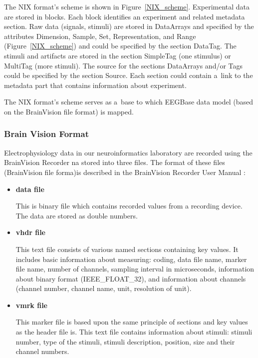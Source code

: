 \documentclass[conference]{IEEEtran}
\begin{document}
The NIX format's scheme is shown in Figure~\ref{NIX_scheme}. Experimental data are stored in blocks. Each block identifies an experiment and related metadata section. Raw data (signals, stimuli) are stored in DataArrays and specified by the attributes Dimension, Sample, Set, Representation, and Range (Figure~\ref{NIX_scheme}) and could be specified by the section DataTag. The stimuli and artifacts are stored in the section SimpleTag (one stimulus) or MultiTag (more stimuli). The source for the sections DataArrays and/or Tags could be specified by the section Source. Each section could contain a~link to the metadata part that contains information about experiment.

The NIX format's scheme serves as a~base to which EEGBase data model (based on the BrainVision file format) is mapped. 

\subsubsection{Brain Vision Format}

Electrophysiology data in our neuroinformatics laboratory are recorded using the BrainVision Recorder \cite{brainvision} na stored into three files. The format of these files (BrainVision file forma)is described in the BrainVision Recorder User Manual \cite{brainUserManual}:
\begin{itemize}
	\item \textbf{data file}
	\label{eeg}
	
	This is binary file which contains recorded values from a recording device. The data are stored as double numbers.
	
	\item \textbf{vhdr file}
	\label{vhdr}
	
	This text file consists of various named sections containing key values. It includes basic information about measuring: coding, data file name, marker file name, number of channels, sampling interval in microseconds, information about binary format (IEEE\_FLOAT\_32), and information about channels (channel number, channel name, unit, resolution of unit). 
	
	\item \textbf{vmrk file}
	\label{vmrk}
	
	This marker file is based upon the same principle of sections and key values as the header file is. This text file contains information about stimuli: stimuli number, type of the stimuli, stimuli description, position, size and their channel numbers.
	
\end{itemize}
\end{document}
